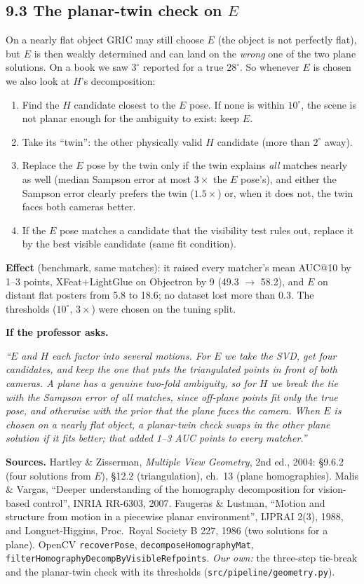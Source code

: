 \documentclass[11pt,a4paper]{article}
\newenvironment{viva}{\par\medskip\noindent\colorbox{gray!12}{\parbox{\dimexpr\linewidth-2\fboxsep}{\textbf{If the professor asks.}\ }}\par\begingroup\itshape}{\endgroup\par\medskip}
\begin{document}
\subsection*{9.3 The planar-twin check on $E$}
On a nearly flat object GRIC may still choose $E$ (the object is not perfectly flat), but $E$ is then weakly determined and can land on the \emph{wrong} one of the two plane solutions. On a book we saw $3^\circ$ reported for a true $28^\circ$. So whenever $E$ is chosen we also look at $H$'s decomposition:
\begin{enumerate}
  \item Find the $H$ candidate closest to the $E$ pose. If none is within $10^\circ$, the scene is not planar enough for the ambiguity to exist: keep $E$.
  \item Take its ``twin'': the other physically valid $H$ candidate (more than $2^\circ$ away).
  \item Replace the $E$ pose by the twin only if the twin explains \emph{all} matches nearly as well (median Sampson error at most $3\times$ the $E$ pose's), and either the Sampson error clearly prefers the twin ($1.5\times$) or, when it does not, the twin faces both cameras better.
  \item If the $E$ pose matches a candidate that the visibility test rules out, replace it by the best visible candidate (same fit condition).
\end{enumerate}
\textbf{Effect} (benchmark, same matches): it raised every matcher's mean AUC@10 by 1--3 points, XFeat+LightGlue on Objectron by 9 (49.3 $\to$ 58.2), and $E$ on distant flat posters from 5.8 to 18.6; no dataset lost more than 0.3. The thresholds ($10^\circ$, $3\times$) were chosen on the tuning split.

\begin{viva}
``$E$ and $H$ each factor into several motions. For $E$ we take the SVD, get four candidates, and keep the one that puts the triangulated points in front of both cameras. A plane has a genuine two-fold ambiguity, so for $H$ we break the tie with the Sampson error of all matches, since off-plane points fit only the true pose, and otherwise with the prior that the plane faces the camera. When $E$ is chosen on a nearly flat object, a planar-twin check swaps in the other plane solution if it fits better; that added 1--3 AUC points to every matcher.''
\end{viva}

\noindent\textbf{Sources.} Hartley \& Zisserman, \emph{Multiple View Geometry}, 2nd ed., 2004: \S9.6.2 (four solutions from $E$), \S12.2 (triangulation), ch.~13 (plane homographies). Malis \& Vargas, ``Deeper understanding of the homography decomposition for vision-based control'', INRIA RR-6303, 2007. Faugeras \& Lustman, ``Motion and structure from motion in a piecewise planar environment'', IJPRAI 2(3), 1988, and Longuet-Higgins, Proc.\ Royal Society B 227, 1986 (two solutions for a plane). OpenCV \texttt{recoverPose}, \texttt{decomposeHomographyMat}, \texttt{filterHomographyDecompByVisibleRefpoints}. \emph{Our own:} the three-step tie-break and the planar-twin check with its thresholds (\texttt{src/pipeline/geometry.py}).
\end{document}
